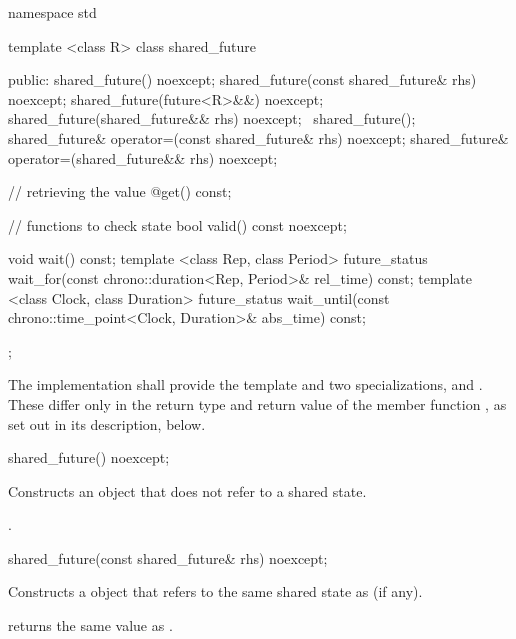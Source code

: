 %
\begin{codeblock}
namespace std {
  template <class R>
  class shared_future {
  public:
    shared_future() noexcept;
    shared_future(const shared_future& rhs) noexcept;
    shared_future(future<R>&&) noexcept;
    shared_future(shared_future&& rhs) noexcept;
    ~shared_future();
    shared_future& operator=(const shared_future& rhs) noexcept;
    shared_future& operator=(shared_future&& rhs) noexcept;

    // retrieving the value
    @\seebelow@ get() const;

    // functions to check state
    bool valid() const noexcept;

    void wait() const;
    template <class Rep, class Period>
      future_status wait_for(const chrono::duration<Rep, Period>& rel_time) const;
    template <class Clock, class Duration>
      future_status wait_until(const chrono::time_point<Clock, Duration>& abs_time) const;
  };
}
\end{codeblock}

\pnum
The implementation shall provide the template  and two
specializations,  and . These
differ only in the return type and return value of the member function , as
set out in its description, below.

%
\begin{itemdecl}
shared_future() noexcept;
\end{itemdecl}

\begin{itemdescr}
\pnum
\effects Constructs an   object that does not refer to a
shared state.

\pnum
\postconditions {}.
\end{itemdescr}

%
\begin{itemdecl}
shared_future(const shared_future& rhs) noexcept;
\end{itemdecl}

\begin{itemdescr}
\pnum
\effects Constructs a  object that refers to the same
shared state as  (if any).

\pnum
\postconditions {} returns the same value as .
\end{itemdescr}

